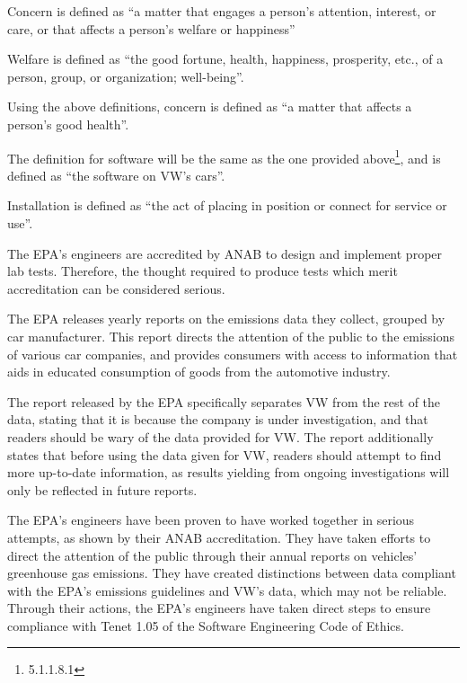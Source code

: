 Concern is defined as ``a matter that engages a person's attention, interest, or care, or that affects a person's welfare or happiness''\cite{dictionary_com}

Welfare is defined as ``the good fortune, health, happiness, prosperity, etc., of a person, group, or organization; well-being''\cite{dictionary_com}.

Using the above definitions, concern is defined as ``a matter that affects a person's good health''.

The definition for software will be the same as the one provided above\footnote{5.1.1.8.1}, and is defined as ``the software on VW's cars''.

Installation is defined as ``the act of placing in position or connect for service or use''\cite{dictionary_com}.


The EPA's engineers are accredited\cite{anab_accreditation} by ANAB\cite{anab_recognition} to design and implement proper lab tests. Therefore, the thought required to produce tests which merit accreditation can be considered serious.

The EPA releases yearly reports on the emissions data they collect, grouped by car manufacturer\cite{epa_ghg_report}. This report directs the attention of the public to the emissions of various car companies, and provides consumers with access to information that aids in educated consumption of goods from the automotive industry.

The report\cite{epa_ghg_report} released by the EPA specifically separates VW from the rest of the data, stating that it is because the company is under investigation, and that readers should be wary of the data provided for VW. The report additionally states that before using the data given for VW, readers should attempt to find more up-to-date information, as results yielding from ongoing investigations will only be reflected in future reports.

The EPA's engineers have been proven to have worked together in serious attempts, as shown by their ANAB accreditation\cite{anab_accreditation}. They have taken efforts to direct the attention of the public through their annual reports on vehicles' greenhouse gas emissions\cite{epa_ghg_report}. They have created distinctions between data compliant with the EPA's emissions guidelines and VW's data, which may not be reliable. Through their actions, the EPA's engineers have taken direct steps to ensure compliance with Tenet 1.05 of the Software Engineering Code of Ethics.